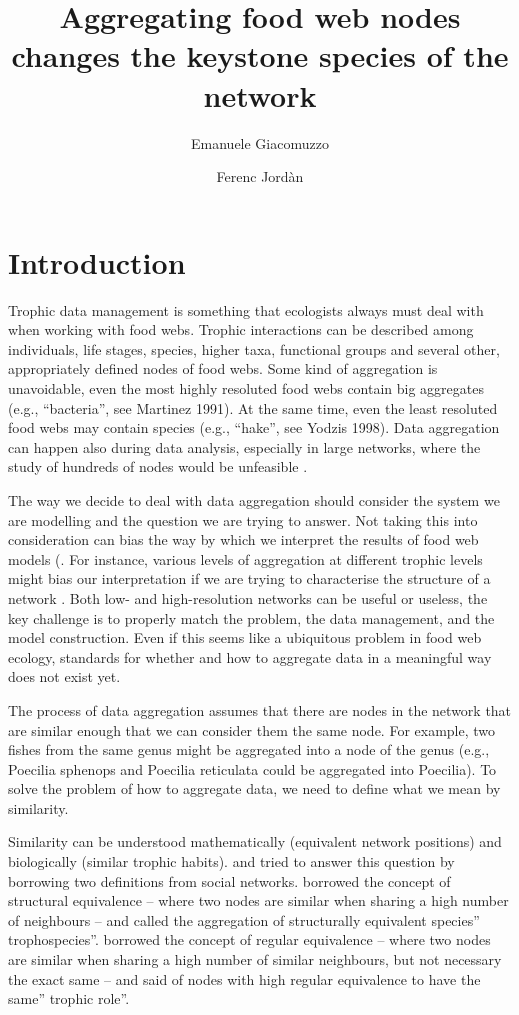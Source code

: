 \documentclass[twocolumn]{article}
\title{Aggregating food web nodes changes the keystone species of the network}
\author[1]{Emanuele Giacomuzzo}
\author[1,2]{Ferenc Jordàn}
\affil[1]{Balaton Limnological Institute, Centre for Ecological Research, Tihany, 8237, Hungary}
\affil[2]{Stazione Zoologica Anton Dohrn, Napoli, 80122, Italy}
\date{}
\begin{document}
\maketitle
\section*{Introduction}
    Trophic data management is something that ecologists always must deal with when working with food webs. Trophic interactions can be described among individuals, life stages, species, higher taxa, functional groups and several other, appropriately defined nodes of food webs. Some kind of aggregation is unavoidable, even the most highly resoluted food webs contain big aggregates (e.g., “bacteria'', see Martinez 1991). At the same time, even the least resoluted food webs may contain species (e.g., “hake”, see Yodzis 1998). Data aggregation can happen also during data analysis, especially in large networks, where the study of hundreds of nodes would be unfeasible \citep{Yodzis1999}.
    \par The way we decide to deal with data aggregation should consider the system we are modelling and the question we are trying to answer. Not taking this into consideration can bias the way by which we interpret the results of food web models (\citep{Paine1988, Hall1993}. For instance, various levels of aggregation at different trophic levels might bias our interpretation if we are trying to characterise the structure of a network \citep{Yodzis1999}. Both low- and high-resolution networks can be useful or useless, the key challenge is to properly match the problem, the data management, and the model construction. Even if this seems like a ubiquitous problem in food web ecology, standards for whether and how to aggregate data in a meaningful way does not exist yet. 
    \par The process of data aggregation assumes that there are nodes in the network that are similar enough that we can consider them the same node. For example, two fishes from the same genus might be aggregated into a node of the genus (e.g., Poecilia sphenops and Poecilia reticulata could be aggregated into Poecilia). To solve the problem of how to aggregate data, we need to define what we mean by similarity. 
    \par Similarity can be understood mathematically (equivalent network positions) and biologically (similar trophic habits). \citet{Yodzis1999} and \citet{Luczkovich2003} tried to answer this question by borrowing two definitions from social networks. \citet{Yodzis1999} borrowed the concept of structural equivalence – where two nodes are similar when sharing a high number of neighbours – and called the aggregation of structurally equivalent species” trophospecies”. \citet{Luczkovich2003} borrowed the concept of regular equivalence – where two nodes are similar when sharing a high number of similar neighbours, but not necessary the exact same – and said of nodes with high regular equivalence to have the same” trophic role”. 
\end{document}

